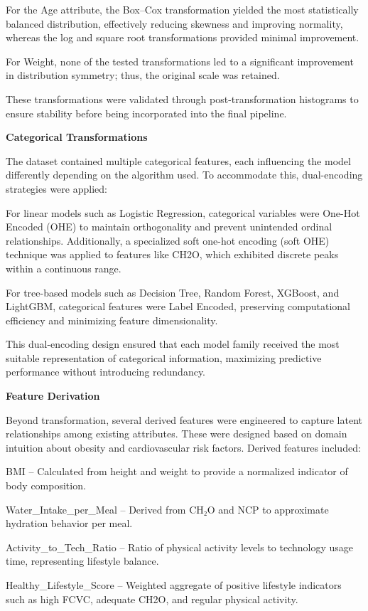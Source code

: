 For the Age attribute, the Box–Cox transformation yielded the most statistically balanced distribution, effectively reducing skewness and improving normality, whereas the log and square root transformations provided minimal improvement.

For Weight, none of the tested transformations led to a significant improvement in distribution symmetry; thus, the original scale was retained.

These transformations were validated through post-transformation histograms to ensure stability before being incorporated into the final pipeline.

\textbf{Categorical Transformations}

The dataset contained multiple categorical features, each influencing the model differently depending on the algorithm used.
To accommodate this, dual-encoding strategies were applied:

For linear models such as Logistic Regression, categorical variables were One-Hot Encoded (OHE) to maintain orthogonality and prevent unintended ordinal relationships.
Additionally, a specialized soft one-hot encoding (soft OHE) technique was applied to features like CH2O, which exhibited discrete peaks within a continuous range.

For tree-based models such as Decision Tree, Random Forest, XGBoost, and LightGBM, categorical features were Label Encoded, preserving computational efficiency and minimizing feature dimensionality.

This dual-encoding design ensured that each model family received the most suitable representation of categorical information, maximizing predictive performance without introducing redundancy.

\textbf{Feature Derivation}

Beyond transformation, several derived features were engineered to capture latent relationships among existing attributes.
These were designed based on domain intuition about obesity and cardiovascular risk factors.
Derived features included:

BMI – Calculated from height and weight to provide a normalized indicator of body composition.

Water\_Intake\_per\_Meal – Derived from CH₂O and NCP to approximate hydration behavior per meal.

Activity\_to\_Tech\_Ratio – Ratio of physical activity levels to technology usage time, representing lifestyle balance.

Healthy\_Lifestyle\_Score – Weighted aggregate of positive lifestyle indicators such as high FCVC, adequate CH2O, and regular physical activity.

